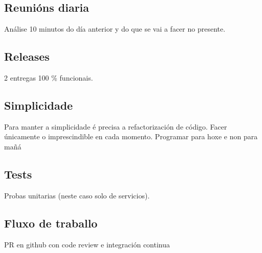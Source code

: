     \subsection{Reunións diaria}
    Análise 10 minutos do día anterior y do que se vai a facer no presente.

    \subsection{Releases}
    2 entregas 100 \% funcionais.

    \subsection{Simplicidade}
    Para manter a simplicidade é precisa a refactorización de código. Facer únicamente o 
imprescindible en cada momento.
    Programar para hoxe e non para mañá

    \subsection{Tests}
    Probas unitarias (neste caso solo de servicios).

    \subsection{Fluxo de traballo}
    PR en github con code review e integración continua

